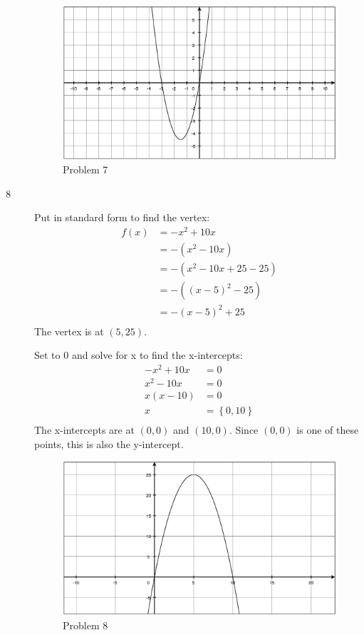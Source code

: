\documentclass{exam}
\begin{document}
\begin{description}
      \begin{figure}[H]
        \centering
        \includegraphics[scale=.3]{problem_07.eps}
        \caption*{Problem 7}
      \end{figure}

    \item[8]
      Put in standard form to find the vertex:
      \begin{align*}
        f(x) &= -x^2 + 10x \\
             &= -(x^2 - 10x) \\
             &= -(x^2 - 10x + 25 - 25) \\
             &= -( (x - 5)^2 - 25) \\
             &= -(x - 5)^2 + 25 \\
      \end{align*}
      The vertex is at $(5, 25)$.

      Set to 0 and solve for x to find the x-intercepts:
      \begin{align*}
        -x^2 + 10x &= 0 \\
        x^2 - 10x  &= 0 \\
        x(x - 10)  &= 0 \\
        x          &= \left\{ 0, 10 \right\} \\
      \end{align*}
      The x-intercepts are at $(0, 0)$ and $(10, 0)$.  Since $(0, 0)$ is one of these points, this is also the y-intercept.

      \begin{figure}[H]
        \centering
        \includegraphics[scale=.3]{problem_08.eps}
        \caption*{Problem 8}
      \end{figure}


\end{description}
\end{document}
